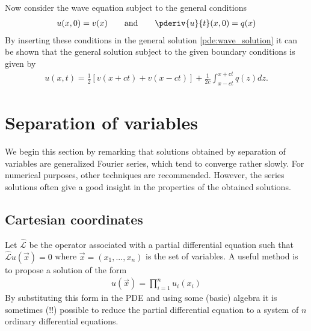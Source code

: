     Now consider the wave equation subject to the general conditions
    \begin{gather}
        u(x, 0) = v(x)\qquad\text{and}\qquad \pderiv{u}{t}(x, 0) = q(x)
    \end{gather}
    By inserting these conditions in the general solution \ref{pde:wave_solution} it can be shown that the general solution subject to the given boundary conditions is given by
    \begin{gather}
        \label{pde:dalembert_solution}
        u(x, t) = \frac{1}{2}\left[v(x+ct) + v(x-ct)\right] + \frac{1}{2c}\int_{x-ct}^{x+ct}q(z)dz.
    \end{gather}


\section{Separation of variables}

    \begin{remark*}
        We begin this section by remarking that solutions obtained by separation of variables are generalized Fourier series, which tend to converge rather slowly. For numerical purposes, other techniques are recommended. However, the series solutions often give a good insight in the properties of the obtained solutions.
    \end{remark*}

\subsection{Cartesian coordinates}

    \begin{method}
        Let $\hat{\mathcal{L}}$ be the operator associated with a partial differential equation such that $\hat{\mathcal{L}}u(\vec{x}) = 0$ where $\vec{x} = (x_1,...,x_n)$ is the set of variables. A useful method is to propose a solution of the form
        \begin{gather}
            u(\vec{x}) = \prod_{i=1}^nu_i(x_i)
        \end{gather}
        By substituting this form in the PDE and using some (basic) algebra it is sometimes (!!) possible to reduce the partial differential equation to a system of $n$ ordinary differential equations.
    \end{method}

